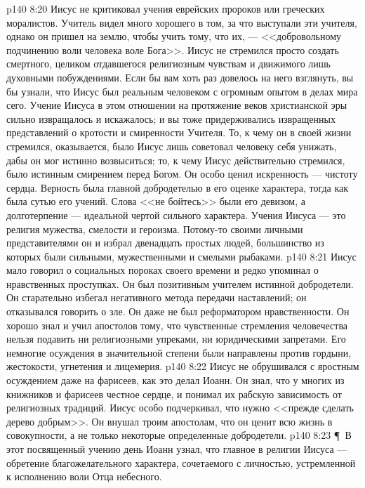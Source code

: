 \vs p140 8:20 Иисус не критиковал учения еврейских пророков или греческих моралистов. Учитель видел много хорошего в том, за что выступали эти учителя, однако он пришел на землю, чтобы учить тому, что  их, --- <<добровольному подчинению воли человека воле Бога>>. Иисус не стремился просто создать  смертного, целиком отдавшегося религиозным чувствам и движимого лишь духовными побуждениями. Если бы вам хоть раз довелось на него взглянуть, вы бы узнали, что Иисус был реальным человеком с огромным опытом в делах мира сего. Учение Иисуса в этом отношении на протяжение веков христианской эры сильно извращалось и искажалось; и вы тоже придерживались извращенных представлений о кротости и смиренности Учителя. То, к чему он в своей жизни стремился, оказывается, было  Иисус лишь советовал человеку себя унижать, дабы он мог истинно возвыситься; то, к чему Иисус действительно стремился, было истинным смирением перед Богом. Он особо ценил искренность --- чистоту сердца. Верность была главной добродетелью в его оценке характера, тогда как  была сутью его учений. Слова <<не бойтесь>> были его девизом, а долготерпение --- идеальной чертой сильного характера. Учения Иисуса --- это религия мужества, смелости и героизма. Потому\hyp{}то своими личными представителями он и избрал двенадцать простых людей, большинство из которых были сильными, мужественными и смелыми рыбаками.
\vs p140 8:21 Иисус мало говорил о социальных пороках своего времени и редко упоминал о нравственных проступках. Он был позитивным учителем истинной добродетели. Он старательно избегал негативного метода передачи наставлений; он отказывался говорить о зле. Он даже не был реформатором нравственности. Он хорошо знал и учил апостолов тому, что чувственные стремления человечества нельзя подавить ни религиозными упреками, ни юридическими запретами. Его немногие осуждения в значительной степени были направлены против гордыни, жестокости, угнетения и лицемерия.
\vs p140 8:22 Иисус не обрушивался с яростным осуждением даже на фарисеев, как это делал Иоанн. Он знал, что у многих из книжников и фарисеев честное сердце, и понимал их рабскую зависимость от религиозных традиций. Иисус особо подчеркивал, что нужно <<прежде сделать дерево добрым>>. Он внушал троим апостолам, что он ценит всю жизнь в совокупности, а не только некоторые определенные добродетели.
\vs p140 8:23 \P\ В этот посвященный учению день Иоанн узнал, что главное в религии Иисуса --- обретение благожелательного характера, сочетаемого с личностью, устремленной к исполнению воли Отца небесного.
